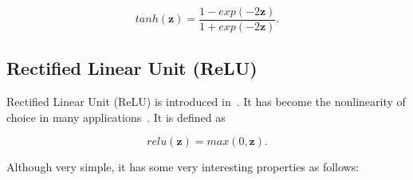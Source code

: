 \begin{equation}\label{eq:tanh}
    tanh(\mathbf{z}) = \frac{1-exp(-2\mathbf{z})}{1+exp(-2\mathbf{z})}.
\end{equation}


\subsection{Rectified Linear Unit (ReLU)}\label{sec:relu}
Rectified Linear Unit (ReLU) is introduced in~\cite{krizhevsky2012imagenet}. It has become the nonlinearity of choice in many applications~\cite{krizhevsky2012imagenet}\cite{he2016deep}. It is defined as

\begin{equation}\label{eq:relu}
    relu(\mathbf{z}) = max(0, \mathbf{z}).
\end{equation}

Although very simple, it has some very interesting properties\cite{he2015delving} as follows:

